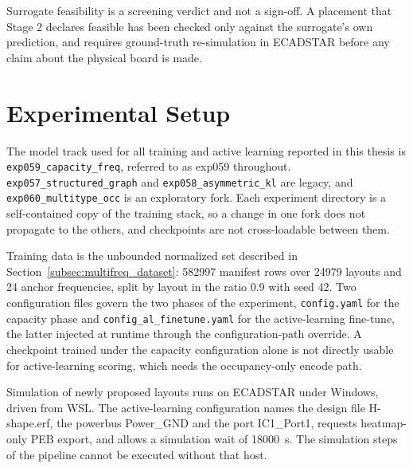 Surrogate feasibility is a screening verdict and not a sign-off. A placement that Stage 2 declares
feasible has been checked only against the surrogate's own prediction, and requires ground-truth
re-simulation in ECADSTAR before any claim about the physical board is made.


\section{Experimental Setup}
\label{sec:experimental_setup}

The model track used for all training and active learning reported in this thesis is
\texttt{exp059\_capacity\_freq}, referred to as exp059 throughout.
\texttt{exp057\_structured\_graph} and \texttt{exp058\_asymmetric\_kl} are legacy, and
\texttt{exp060\_multitype\_occ} is an exploratory fork. Each experiment directory is a self-contained
copy of the training stack, so a change in one fork does not propagate to the others, and checkpoints
are not cross-loadable between them.

Training data is the unbounded normalized set described in Section~\ref{subsec:multifreq_dataset}:
582997 manifest rows over 24979 layouts and 24 anchor frequencies, split by layout in the ratio 0.9
with seed 42. Two configuration files govern the two phases of the experiment, \texttt{config.yaml}
for the capacity phase and \texttt{config\_al\_finetune.yaml} for the active-learning fine-tune, the
latter injected at runtime through the configuration-path override. A checkpoint trained under the
capacity configuration alone is not directly usable for active-learning scoring, which needs the
occupancy-only encode path.


Simulation of newly proposed layouts runs on ECADSTAR under Windows, driven from WSL. The
active-learning configuration names the design file H-shape.erf, the powerbus Power\_GND and the port
IC1\_Port1, requests heatmap-only PEB export, and allows a simulation wait of 18000~s. The simulation
steps of the pipeline cannot be executed without that host.

